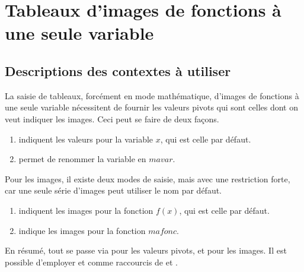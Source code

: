 \documentclass{tutodoc}
\begin{document}
\section{Tableaux d'images de fonctions à une seule variable}

\subsection{Descriptions des contextes à utiliser}

La saisie de tableaux, forcément en mode mathématique, d'images de fonctions à une seule variable nécessitent de fournir les valeurs pivots qui sont celles dont on veut indiquer les images. Ceci peut se faire de deux façons.
%
\begin{enumerate}
	\item {} indiquent les valeurs pour la variable $x$, qui est celle par défaut.

	\item {} permet de renommer la variable en $mavar$.
\end{enumerate}


Pour les images, il existe deux modes de saisie, mais avec une restriction forte, car une seule série d'images peut utiliser le nom par défaut.
%
\begin{enumerate}
	\item {} indiquent les images pour la fonction $f(x)$, qui est celle par défaut.

	\item {} indique les images pour la fonction $mafonc$.
\end{enumerate}

En résumé, tout se passe via  pour les valeurs pivots, et  pour les images.
%
Il est possible d'employer  et  comme raccourcis de  et .
\end{document}
